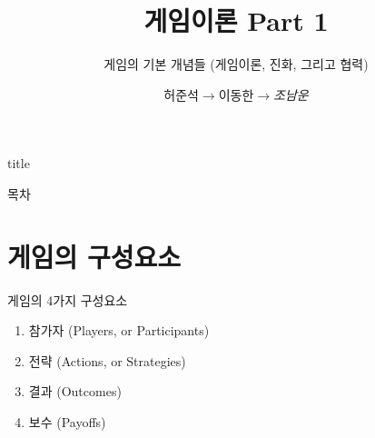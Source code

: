 \documentclass[final]{beamer}
\title{게임이론 Part 1}
\subtitle{게임의 기본 개념들 (게임이론, 진화, 그리고 협력)}
\author[조남운]{허준석$\rightarrow$이동한$\rightarrow$\emph{조남운}\\\mail}
\begin{document}
\begin{frame}[t]{title}
	\titlepage
\end{frame}

\begin{frame}[t]{목차}
	\tableofcontents
\end{frame}

\section{게임의 구성요소} %
\label{sec:basicStructure}
\begin{frame}[t]{게임의 4가지 구성요소}
	\begin{enumerate}
		\item 참가자 (Players, or Participants)
		\item 전략 (Actions, or Strategies)
		\item 결과 (Outcomes)
		\item 보수 (Payoffs)
	\end{enumerate}
	\begin{center}
	\end{center}
\end{frame}
\end{document}
